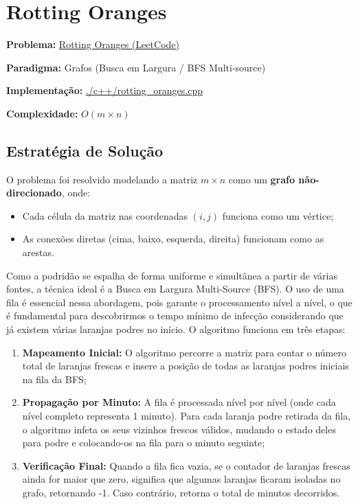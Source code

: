 \documentclass[
    12pt,
    oneside,
    a4paper,
    brazil
]{abntex2}
\begin{document}
\imprimircapa

\tableofcontents*
\cleardoublepage

\OnehalfSpacing

\chapter{Rotting Oranges}

\textbf{Problema:} \href{https://leetcode.com/problems/rotting-oranges/}{Rotting Oranges (LeetCode)}

\textbf{Paradigma:} Grafos (Busca em Largura / BFS Multi-source)

\textbf{Implementação:} \href{https://github.com/BccMaterial/AA-Trabalho/blob/main/c++/rotting\_oranges.cpp}{./c++/rotting\_oranges.cpp}

\textbf{Complexidade:} $O(m \times n)$

\section{Estratégia de Solução}

O problema foi resolvido modelando a matriz $m \times n$  como um \textbf{grafo não-direcionado}, onde:
\begin{itemize}
	\item{Cada célula da matriz nas coordenadas $(i, j)$ funciona como um vértice;}
	\item{As conexões diretas (cima, baixo, esquerda, direita) funcionam como as arestas.}
\end{itemize}

Como a podridão se espalha de forma uniforme e simultânea a partir de várias fontes, a técnica ideal é a Busca em Largura Multi-Source (BFS). O uso de uma fila é essencial nessa abordagem, pois garante o processamento nível a nível, o que é fundamental para descobrirmos o tempo mínimo de infecção considerando que já existem várias laranjas podres no início. O algoritmo funciona em três etapas:
\begin{enumerate}
	\item{\textbf{Mapeamento Inicial:} O algoritmo percorre a matriz para contar o número total de laranjas frescas e insere a posição de todas as laranjas podres iniciais na fila da BFS;}
	\item{\textbf{Propagação por Minuto:} A fila é processada nível por nível (onde cada nível completo representa 1 minuto). Para cada laranja podre retirada da fila, o algoritmo infeta os seus vizinhos frescos válidos, mudando o estado deles para podre e colocando-os na fila para o minuto seguinte;}
	\item{\textbf{Verificação Final:} Quando a fila fica vazia, se o contador de laranjas frescas ainda for maior que zero, significa que algumas laranjas ficaram isoladas no grafo, retornando -1. Caso contrário, retorna o total de minutos decorridos.}
\end{enumerate}
\end{document}
